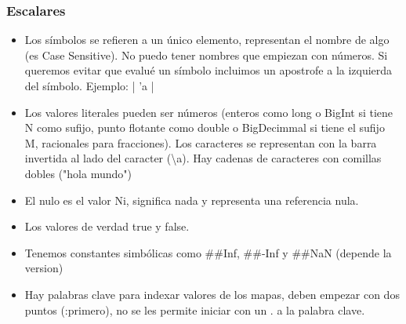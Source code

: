 \subsubsection*{Escalares}

\begin{itemize}
\item Los símbolos se refieren a un único elemento, representan el nombre de algo (es Case Sensitive). No puedo tener nombres que empiezan con números. Si queremos evitar que evalué un símbolo incluimos un apostrofe a la izquierda del símbolo.  Ejemplo: | 'a |
\item Los valores literales pueden ser números (enteros como long o BigInt si tiene N como sufijo, punto flotante como double o BigDecimmal si tiene el sufijo M, racionales para fracciones). Los caracteres se representan con la barra invertida al lado del caracter (\textbackslash a). Hay cadenas de caracteres con comillas dobles ("hola mundo")
\item El nulo es el valor Ni, significa nada y representa una referencia nula.
\item Los valores de verdad true y false.
\item Tenemos constantes simbólicas como \#\#Inf, \#\#-Inf y \#\#NaN (depende la version)
\item Hay palabras clave para indexar valores de los mapas, deben empezar con dos puntos (:primero), no se les permite iniciar con un . a la palabra clave.
\end{itemize}

